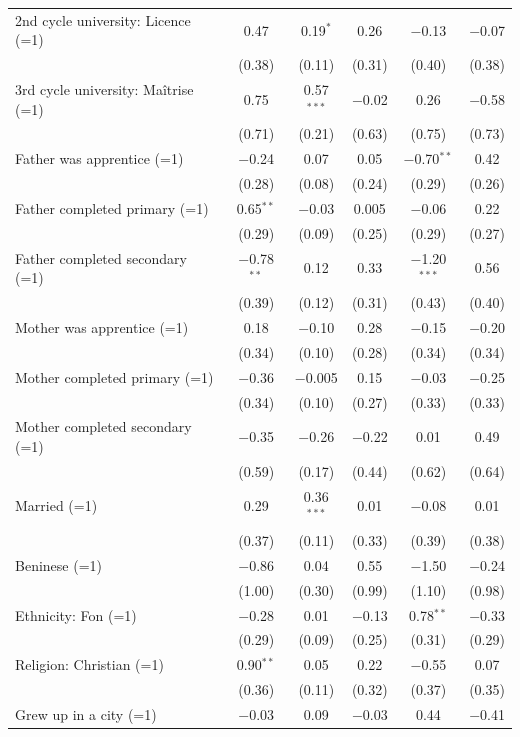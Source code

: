 \documentclass[
  11pt,
a4paper
]{article}
\begin{document}
\begin{table}[H]
\begin{tabular}{@{\extracolsep{3pt}}lccccc}
  2nd cycle university: Licence (=1) & 0.47 & 0.19$^{*}$ & 0.26 & $-$0.13 & $-$0.07 \\ 
  & (0.38) & (0.11) & (0.31) & (0.40) & (0.38) \\ 
  3rd cycle university: Maîtrise (=1) & 0.75 & 0.57$^{***}$ & $-$0.02 & 0.26 & $-$0.58 \\ 
  & (0.71) & (0.21) & (0.63) & (0.75) & (0.73) \\ 
  Father was apprentice (=1) & $-$0.24 & 0.07 & 0.05 & $-$0.70$^{**}$ & 0.42 \\ 
  & (0.28) & (0.08) & (0.24) & (0.29) & (0.26) \\ 
  Father completed primary (=1) & 0.65$^{**}$ & $-$0.03 & 0.005 & $-$0.06 & 0.22 \\ 
  & (0.29) & (0.09) & (0.25) & (0.29) & (0.27) \\ 
  Father completed secondary (=1) & $-$0.78$^{**}$ & 0.12 & 0.33 & $-$1.20$^{***}$ & 0.56 \\ 
  & (0.39) & (0.12) & (0.31) & (0.43) & (0.40) \\ 
  Mother was apprentice (=1) & 0.18 & $-$0.10 & 0.28 & $-$0.15 & $-$0.20 \\ 
  & (0.34) & (0.10) & (0.28) & (0.34) & (0.34) \\ 
  Mother completed primary (=1) & $-$0.36 & $-$0.005 & 0.15 & $-$0.03 & $-$0.25 \\ 
  & (0.34) & (0.10) & (0.27) & (0.33) & (0.33) \\ 
  Mother completed secondary (=1) & $-$0.35 & $-$0.26 & $-$0.22 & 0.01 & 0.49 \\ 
  & (0.59) & (0.17) & (0.44) & (0.62) & (0.64) \\ 
  Married (=1) & 0.29 & 0.36$^{***}$ & 0.01 & $-$0.08 & 0.01 \\ 
  & (0.37) & (0.11) & (0.33) & (0.39) & (0.38) \\ 
  Beninese (=1) & $-$0.86 & 0.04 & 0.55 & $-$1.50 & $-$0.24 \\ 
  & (1.00) & (0.30) & (0.99) & (1.10) & (0.98) \\ 
  Ethnicity: Fon (=1) & $-$0.28 & 0.01 & $-$0.13 & 0.78$^{**}$ & $-$0.33 \\ 
  & (0.29) & (0.09) & (0.25) & (0.31) & (0.29) \\ 
  Religion: Christian (=1) & 0.90$^{**}$ & 0.05 & 0.22 & $-$0.55 & 0.07 \\ 
  & (0.36) & (0.11) & (0.32) & (0.37) & (0.35) \\ 
  Grew up in a city (=1) & $-$0.03 & 0.09 & $-$0.03 & 0.44 & $-$0.41 \\ 

\end{tabular}
\end{table}
\end{document}
